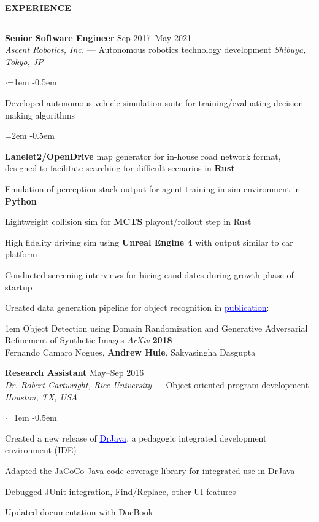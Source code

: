 \documentclass[10pt, a4paper]{article}
\newenvironment{aSection}[1]{
    \medskip \textbf{\uppercase{#1}}
    \smallskip
    \hrule
    \begin{list}{}{
            \setlength{\leftmargin}{1.5em}
        }
    \item[]
    }{
    \end{list}
}
\newenvironment{expSubsection}[4]{
    \textbf{#3} \hfill {#2} \\
    {#1} \hfill \textit{#4}
    \smallskip
    \begin{list}{$\cdot$}{\leftmargin=1em}
    \itemsep -0.5em \vspace{-0.5em}
    }{
    \end{list}
    \vspace{0.5em}
}
\newenvironment{subList}{
    \begin{list}{\raisebox{.4ex}{\tiny$\succ$}}{\leftmargin=2em}
    \itemsep -0.5em \vspace{-0.5em}
    }{
    \end{list}
}
\begin{document}
\begin{aSection}{Experience}
    \begin{expSubsection}
        {\textit{Ascent Robotics, Inc.} --- Autonomous robotics technology development}
        {Sep 2017--May 2021}
        {Senior Software Engineer}
        {Shibuya, Tokyo, JP}
    \item Developed autonomous vehicle simulation suite for training/evaluating decision-making
        algorithms
        \begin{subList}
            \item \textbf{Lanelet2/OpenDrive} map generator for in-house road network format, designed to
                facilitate searching for difficult scenarios in \textbf{Rust}
            \item Emulation of perception stack output for agent training in sim environment in
                \textbf{Python}
            \item Lightweight collision sim for \textbf{MCTS} playout/rollout step in Rust
            \item High fidelity driving sim using \textbf{Unreal Engine 4} with output similar to car
                platform
        \end{subList}
    \item Conducted screening interviews for hiring candidates during growth phase of startup
    \item Created data generation pipeline for object recognition in
        \href{https://arxiv.org/abs/1805.11778}{\textcolor{blue}{\underline{publication}}}:
        \begin{adjustwidth}{1em}{}
            \vspace{-0.5em}
            Object Detection using Domain Randomization and Generative Adversarial Refinement
            of Synthetic Images \textit{ArXiv} \textbf{2018}\\
            \hspace*{1em} Fernando Camaro Nogues, \textbf{Andrew Huie}, Sakyasingha Dasgupta
        \end{adjustwidth}
    \end{expSubsection}

    \begin{expSubsection}
        {\textit{Dr. Robert Cartwright, Rice University} --- Object-oriented program development}
        {May--Sep 2016}
        {Research Assistant}
        {Houston, TX, USA}
    \item Created a new release of
        \href{http://www.drjava.org}{\textcolor{blue}{\underline{DrJava}}}, a pedagogic integrated
        development environment (IDE)
    \item Adapted the JaCoCo Java code coverage library for integrated use in DrJava
    \item Debugged JUnit integration, Find/Replace, other UI features
    \item Updated documentation with DocBook
    \end{expSubsection}


\end{aSection}
\end{document}

